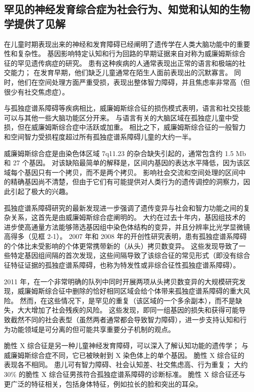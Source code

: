 \subsection{罕见的神经发育综合症为社会行为、知觉和认知的生物学提供了见解}

在儿童时期表现出来的神经和发育障碍已经阐明了遗传学在人类大脑功能中的重要性和复杂性。
基因影响特定认知和行为回路的早期证据来自对称为威廉姆斯综合征的罕见遗传病症的研究。
患有这种疾病的人通常表现出正常的语言和极端的社交能力；
在发育早期，他们缺乏儿童通常在陌生人面前表现出的沉默寡言。
同时，他们在空间处理方面严重受损，表现出整体智力障碍，并且焦虑率非常高（但很少有社交焦虑症）。


与孤独症谱系障碍等疾病相比，威廉姆斯综合征的损伤模式表明，语言和社交技能可以与其他一些大脑功能区分开来。
与语言有关的大脑区域在孤独症儿童中受损，但在威廉姆斯综合症中活跃或加重。
相比之下，威廉姆斯综合征的一般智力和空间智力受损程度超过所有孤独症谱系障碍儿童的大约一半。


威廉姆斯综合症是由染色体区域 7q11.23 的杂合缺失引起的，通常包含约 1.5 Mb 和 27 个基因。
对该缺陷最简单的解释是，区间内基因的表达水平降低，因为该区域每个基因只有一个拷贝，而不是两个拷贝。
影响社会交流和空间处理的区间中的精确基因尚不清楚，但由于它们有可能提供对人类行为的遗传调控的洞察力，因此引起了极大的兴趣。


孤独症谱系障碍研究的最新发现进一步强调了遗传变异与社会和智力功能之间的复杂关系，这首先是由威廉姆斯综合症阐明的。
大约在过去十年内，基因组技术的进步使高通量方法能够筛选基因组中染色体结构的变异，并且分辨率比光学显微镜高得多（见框 2-1）。
2007 年和 2008 年的开创性研究表明，患有孤独症谱系障碍的个体比未受影响的个体更常携带新的（从头）拷贝数变异。
这些发现导致了一些特定基因组间隔的首次发现，这些间隔导致了该综合征的常见形式（即没有综合征特征证据的孤独症谱系障碍，也称为特发性或非综合征性孤独症谱系障碍）。


2011 年，在一个非常明确的队列中同时开展两项从头拷贝数变异的大规模研究发现，威廉姆斯综合征中删除的恰好相同区域会给个体带来孤独症谱系障碍的重大风险。
然而，在这些情况下，是罕见的重复（该区域的一个多余副本），而不是缺失，大大增加了社会残疾的风险。
这些发现，即同一组基因的损失和获得可能导致截然不同的社会表型（虽然两者通常都会导致智力障碍），进一步支持认知和行为功能领域是可分离的但可能共享重要分子机制的观点。


脆性 X 综合征是另一种儿童神经发育障碍，可以深入了解认知功能的遗传学； 与威廉姆斯综合症不同，它已被映射到 X 染色体上的单个基因。
脆性 X 综合征的表现各不相同。
患儿可有智力障碍、社会认知差、社交焦虑高、行为重复；
大约 30\% 的脆性 X 综合征男孩符合孤独症谱系障碍的诊断标准。
脆性 X 综合征还与更广泛的特征相关，包括身体特征，例如拉长的脸和突出的耳朵。


